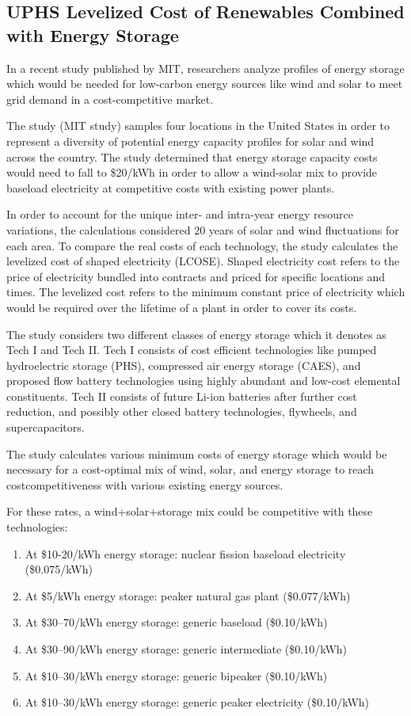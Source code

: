 \documentclass[hidelinks,12pt,a4paper]{article}
\begin{document}
\subsection{UPHS Levelized Cost of Renewables Combined with Energy Storage}
In a recent study published by MIT, researchers analyze profiles of energy storage which would be needed for low-carbon energy sources like wind and solar to meet grid demand in a cost-competitive market.

The study (MIT study) samples four locations in the United States in order to represent a diversity of potential energy capacity profiles for solar and wind across the country. The study determined that energy storage capacity costs would need to fall to \$20/kWh in order to allow a wind-solar mix to provide baseload electricity at competitive costs with existing power plants.

In order to account for the unique inter- and intra-year energy resource variations, the calculations considered 20 years of solar and wind fluctuations for each area. To compare the real costs of each technology, the study calculates the levelized cost of shaped electricity (LCOSE). Shaped electricity cost refers to the price of electricity bundled into contracts and priced for specific locations and times. The levelized cost refers to the minimum constant price of electricity which would be required over the lifetime of a plant in order to cover its costs.

The study considers two different classes of energy storage which it denotes as Tech I and Tech II. Tech I consists of cost efficient technologies like pumped hydroelectric storage (PHS), compressed air energy storage (CAES), and proposed flow battery technologies using highly abundant and low-cost elemental constituents. Tech II consists of future Li-ion batteries after further cost reduction, and possibly other closed battery technologies, flywheels, and supercapacitors. \cite{StorageRequirementsAndCostsOfShapingRenewableEnergy}

The study calculates various minimum costs of energy storage which would be necessary for a cost-optimal mix of wind, solar, and energy storage to reach costcompetitiveness with various existing energy sources.

For these rates, a wind+solar+storage mix could be competitive with these technologies:
{\footnotesize
\begin{enumerate}
    \item At \$10-20/kWh energy storage: nuclear fission baseload electricity (\$0.075/kWh)
    \item At \$5/kWh energy storage: peaker natural gas plant (\$0.077/kWh)
    \item At \$30–70/kWh energy storage: generic baseload (\$0.10/kWh)
    \item At \$30–90/kWh energy storage: generic intermediate (\$0.10/kWh)
    \item At \$10–30/kWh energy storage: generic bipeaker (\$0.10/kWh)
    \item At \$10–30/kWh energy storage: generic peaker electricity (\$0.10/kWh)
\end{enumerate}
}
\end{document}
